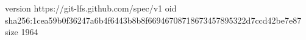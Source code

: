 version https://git-lfs.github.com/spec/v1
oid sha256:1cea59b0f36247a6b4f6443b8b8f66946708718673457895322d7ccd42be7e87
size 1964
